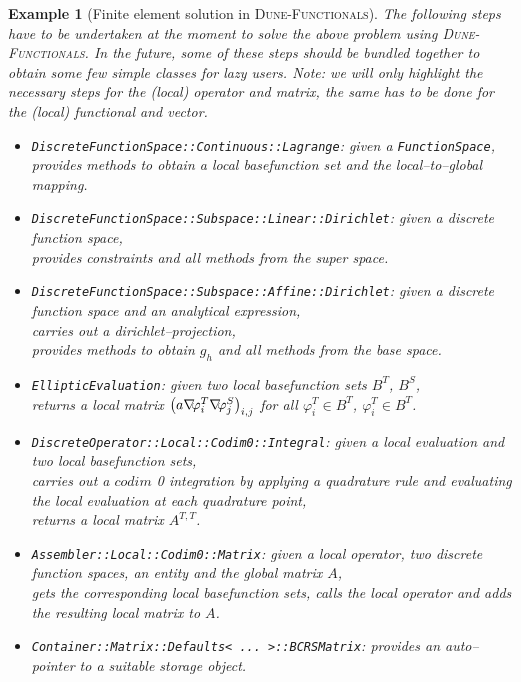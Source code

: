 \documentclass[a4paper,11pt]{article}
\numberwithin{equation}{section}
\newtheorem{example}[definition]{Example}
\newcommand{\CodeT}[1]{\textnormal{\texttt{#1}}}
\newcommand{\dunefunctionals}{\textsc{Dune-Functionals}\xspace}
\newcommand{\hnS}{\hspace{-1.25pt}}
\newcommand{\gradient}{\nabla\hnS\hnS}
\begin{document}
\begin{example}[Finite element solution in \dunefunctionals]
	\label{example::discretization::solution_dune_functionals}
	The following steps have to be undertaken at the moment to solve the above problem using \dunefunctionals.
	In the future, some of these steps should be bundled together to obtain some few simple classes for lazy users.
	Note: we will only highlight the necessary steps for the (local) operator and matrix, the same has to be done for the
	(local) functional and vector.
	\begin{itemize}
		\item \CodeT{DiscreteFunctionSpace::Continuous::Lagrange}: given a \CodeT{FunctionSpace},\\
			provides methods to obtain a local basefunction set and the local--to--global mapping.
		\item \CodeT{DiscreteFunctionSpace::Subspace::Linear::Dirichlet}: given a discrete function space,\\
			provides constraints and all methods from the super space.
		\item \CodeT{DiscreteFunctionSpace::Subspace::Affine::Dirichlet}: given a discrete function space and an analytical
			expression,\\
			carries out a dirichlet--projection,\\
			provides methods to obtain $g_h$ and all methods from the base space.
	  \item \CodeT{EllipticEvaluation}: given two local basefunction sets $B^T$, $B^S$,\\
			returns a local matrix ${\big(a \gradient \varphi_i^T \gradient \varphi_j^S\big)_{i,j}}$ for all ${\varphi_i^T \in B^T}$,
			${\varphi_i^T \in B^T}$.
		\item \CodeT{DiscreteOperator::Local::Codim0::Integral}: given a local evaluation and two local basefunction sets,\\
			carries out a $codim$ 0 integration by applying a quadrature rule and evaluating the local evaluation at each quadrature point,\\
			returns a local matrix ${A^{T,T}}$.
		\item \CodeT{Assembler::Local::Codim0::Matrix}: given a local operator, two discrete function spaces, an entity and
			the global matrix $A$,\\
			gets the corresponding local basefunction sets, calls the local operator and adds the resulting local matrix to
			$A$.
		\item \CodeT{Container::Matrix::Defaults< ... >::BCRSMatrix}: provides an auto--pointer to a suitable storage object.

\end{itemize}
\end{example}
\end{document}
